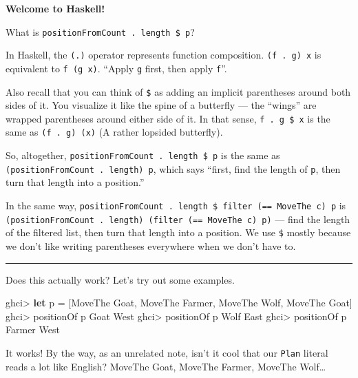 \documentclass[]{article}
\newenvironment{Shaded}{}{}
\newcommand{\KeywordTok}[1]{\textcolor[rgb]{0.00,0.44,0.13}{\textbf{{#1}}}}
\newcommand{\DataTypeTok}[1]{\textcolor[rgb]{0.56,0.13,0.00}{{#1}}}
\newcommand{\FunctionTok}[1]{\textcolor[rgb]{0.02,0.16,0.49}{{#1}}}
\newcommand{\NormalTok}[1]{{#1}}
\begin{document}
\textbf{Welcome to Haskell!}

What is \texttt{positionFromCount\ .\ length\ \$\ p}?

In Haskell, the \texttt{(.)} operator represents function composition.
\texttt{(f\ .\ g)\ x} is equivalent to \texttt{f\ (g\ x)}. ``Apply
\texttt{g} first, then apply \texttt{f}''.

Also recall that you can think of \texttt{\$} as adding an implicit
parentheses around both sides of it. You visualize it like the spine of
a butterfly --- the ``wings'' are wrapped parentheses around either side
of it. In that sense, \texttt{f\ .\ g\ \$\ x} is the same as
\texttt{(f\ .\ g)\ (x)} (A rather lopsided butterfly).

So, altogether, \texttt{positionFromCount\ .\ length\ \$\ p} is the same
as \texttt{(positionFromCount\ .\ length)\ p}, which says ``first, find
the length of \texttt{p}, then turn that length into a position.''

In the same way,
\texttt{positionFromCount\ .\ length\ \$\ filter\ (==\ MoveThe\ c)\ p}
is
\texttt{(positionFromCount\ .\ length)\ (filter\ (==\ MoveThe\ c)\ p)}
--- find the length of the filtered list, then turn that length into a
position. We use \texttt{\$} mostly because we don't like writing
parentheses everywhere when we don't have to.

\begin{center}\rule{0.5\linewidth}{\linethickness}\end{center}

Does this actually work? Let's try out some examples.

\begin{Shaded}
\begin{Highlighting}[]
\NormalTok{ghci}\FunctionTok{>} \KeywordTok{let} \NormalTok{p }\FunctionTok{=} \NormalTok{[}\DataTypeTok{MoveThe} \DataTypeTok{Goat}\NormalTok{, }\DataTypeTok{MoveThe} \DataTypeTok{Farmer}\NormalTok{, }\DataTypeTok{MoveThe} \DataTypeTok{Wolf}\NormalTok{, }\DataTypeTok{MoveThe} \DataTypeTok{Goat}\NormalTok{]}
\NormalTok{ghci}\FunctionTok{>} \NormalTok{positionOf p }\DataTypeTok{Goat}
\DataTypeTok{West}
\NormalTok{ghci}\FunctionTok{>} \NormalTok{positionOf p }\DataTypeTok{Wolf}
\DataTypeTok{East}
\NormalTok{ghci}\FunctionTok{>} \NormalTok{positionOf p }\DataTypeTok{Farmer}
\DataTypeTok{West}
\end{Highlighting}
\end{Shaded}

It works! By the way, as an unrelated note, isn't it cool that our
\texttt{Plan} literal reads a lot like English? MoveThe Goat, MoveThe
Farmer, MoveThe Wolf\ldots{}
\end{document}
